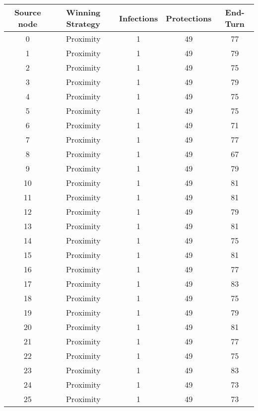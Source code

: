 \documentclass[results.tex]{subfiles}
\begin{document}
\begin{center}
  \begin{tabular}{| c || c | c | c | c |}
    \hline
    {\bfseries Source node} & {\bfseries Winning Strategy} & {\bfseries Infections} & {\bfseries Protections} & {\bfseries End-Turn} \\  %
    \hline\hline
    0 & Proximity & 1 & 49 & 77 \\ 
    \hline
    1 & Proximity & 1 & 49 & 79 \\ 
    \hline
    2 & Proximity & 1 & 49 & 75 \\ 
    \hline
    3 & Proximity & 1 & 49 & 79 \\ 
    \hline
    4 & Proximity & 1 & 49 & 75 \\ 
    \hline
    5 & Proximity & 1 & 49 & 75 \\ 
    \hline
    6 & Proximity & 1 & 49 & 71 \\ 
    \hline
    7 & Proximity & 1 & 49 & 77 \\ 
    \hline
    8 & Proximity & 1 & 49 & 67 \\ 
    \hline
    9 & Proximity & 1 & 49 & 79 \\ 
    \hline
    10 & Proximity & 1 & 49 & 81 \\ 
    \hline
    11 & Proximity & 1 & 49 & 81 \\ 
    \hline
    12 & Proximity & 1 & 49 & 79 \\ 
    \hline
    13 & Proximity & 1 & 49 & 81 \\ 
    \hline
    14 & Proximity & 1 & 49 & 75 \\ 
    \hline
    15 & Proximity & 1 & 49 & 81 \\ 
    \hline
    16 & Proximity & 1 & 49 & 77 \\ 
    \hline
    17 & Proximity & 1 & 49 & 83 \\ 
    \hline
    18 & Proximity & 1 & 49 & 75 \\ 
    \hline
    19 & Proximity & 1 & 49 & 79 \\ 
    \hline
    20 & Proximity & 1 & 49 & 81 \\ 
    \hline
    21 & Proximity & 1 & 49 & 77 \\ 
    \hline
    22 & Proximity & 1 & 49 & 75 \\ 
    \hline
    23 & Proximity & 1 & 49 & 83 \\ 
    \hline
    24 & Proximity & 1 & 49 & 73 \\ 
    \hline
    25 & Proximity & 1 & 49 & 73 \\ 

\end{tabular}
\end{center}
\end{document}
